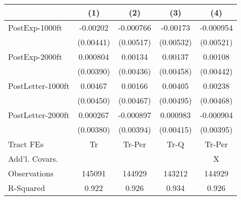 {
\def\sym#1{\ifmmode^{#1}\else\(^{#1}\)\fi}
\begin{tabular}{l*{4}{c}}
\toprule
                    &\multicolumn{1}{c}{(1)}   &\multicolumn{1}{c}{(2)}   &\multicolumn{1}{c}{(3)}   &\multicolumn{1}{c}{(4)}   \\
\midrule
PostExp-1000ft      &    -0.00202   &   -0.000766   &    -0.00173   &   -0.000954   \\
                    &   (0.00441)   &   (0.00517)   &   (0.00532)   &   (0.00521)   \\
\addlinespace
PostExp-2000ft      &    0.000804   &     0.00134   &     0.00137   &     0.00108   \\
                    &   (0.00390)   &   (0.00436)   &   (0.00458)   &   (0.00442)   \\
\addlinespace
PostLetter-1000ft   &     0.00467   &     0.00166   &     0.00405   &     0.00238   \\
                    &   (0.00450)   &   (0.00467)   &   (0.00495)   &   (0.00468)   \\
\addlinespace
PostLetter-2000ft   &    0.000267   &   -0.000897   &    0.000983   &   -0.000904   \\
                    &   (0.00380)   &   (0.00394)   &   (0.00415)   &   (0.00395)   \\
\midrule
Tract FEs           &          Tr   &      Tr-Per   &        Tr-Q   &      Tr-Per   \\
Add'l. Covars.      &               &               &               &           X   \\
Observations        &      145091   &      144929   &      143212   &      144929   \\
R-Squared           &       0.922   &       0.926   &       0.934   &       0.926   \\
\bottomrule
\end{tabular}
}
